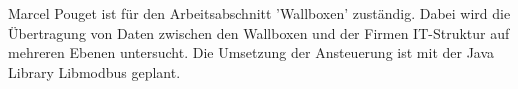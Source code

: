 Marcel Pouget ist für den Arbeitsabschnitt 'Wallboxen' zuständig. Dabei wird die Übertragung von Daten zwischen den Wallboxen und der Firmen IT-Struktur auf mehreren Ebenen untersucht. Die Umsetzung der Ansteuerung ist mit der Java Library Libmodbus geplant.